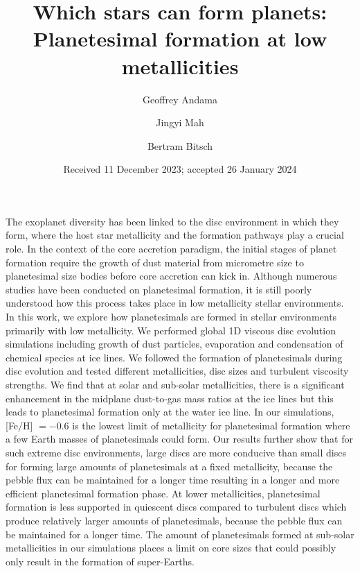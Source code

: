 \documentclass{aa}
\begin{document}
 


   \title{Which stars can form planets: Planetesimal formation at low metallicities}

   \author{Geoffrey Andama
          \and
          Jingyi Mah
          \and
          Bertram Bitsch
          }


   \date{Received 11 December 2023; accepted 26 January 2024}

  \abstract
   {The exoplanet diversity has been linked to the disc environment in which they form, where the host star metallicity and the formation pathways play a crucial role. In the context of the core accretion paradigm, the initial stages of planet formation require the growth of dust material from micrometre size to planetesimal size bodies before core accretion can kick in. Although numerous studies have been conducted on planetesimal formation, it is still poorly understood how this process takes place in low metallicity stellar environments. In this work, we explore how planetesimals are formed in stellar environments primarily with low metallicity. We performed global 1D viscous disc evolution simulations including growth of dust particles,  evaporation and condensation of chemical species at ice lines. We followed the formation of planetesimals during  disc evolution and tested different metallicities, disc sizes and turbulent viscosity strengths.  We find that at solar and sub-solar metallicities, there is a significant enhancement in the midplane dust-to-gas mass ratios at the ice lines but this leads to planetesimal formation only at the water ice line. In our simulations, [Fe/H] $= -0.6$ is the lowest limit of metallicity for planetesimal formation where a few Earth masses of planetesimals could form. Our results further show that for such extreme disc environments, large discs are more conducive than small discs for forming large amounts of planetesimals at a fixed metallicity, because the pebble flux can be maintained for a longer time resulting in a longer and more efficient planetesimal formation phase. At lower metallicities, planetesimal formation  is less supported in quiescent discs compared to turbulent discs which produce relatively larger amounts of planetesimals, because the pebble flux can be maintained for a longer time. The amount of planetesimals formed at sub-solar metallicities in our simulations places a limit on core sizes that could possibly only result in the formation of super-Earths. 
   }
\end{document}
